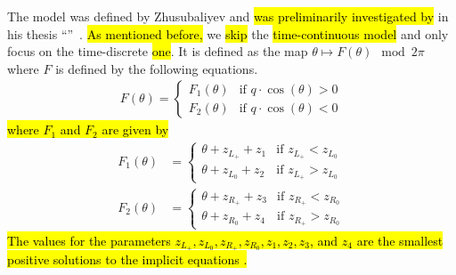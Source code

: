 The model was defined by Zhusubaliyev and \hl{was preliminarily investigated by } in his thesis ``''~\cite{akyuz2022}.
\hl{As mentioned before,} we \hl{skip} the \hl{time-continuous model} and only focus on the time-discrete \hl{one}.
It is defined as the map $\theta \mapsto F(\theta) \mod 2 \pi$ where $F$ is defined by the following equations.
\begin{align}
	F(\theta) = \begin{cases}
		            F_1(\theta) & \text{if } q \cdot \cos(\theta) > 0 \\
		            F_2(\theta) & \text{if } q \cdot \cos(\theta) < 0
	            \end{cases}
\end{align}
\hl{where $F_1$ and $F_2$ are given by}
\begin{subequations}
	\begin{align}
		F_1(\theta) & = \begin{cases}
			                \theta + z_{L_+} + z_1 & \text{if } z_{L_+} < z_{L_0} \\
			                \theta + z_{L_0} + z_2 & \text{if } z_{L_+} > z_{L_0}
		                \end{cases} \\
		F_2(\theta) & = \begin{cases}
			                \theta + z_{R_+} + z_3 & \text{if } z_{R_+} < z_{R_0} \\
			                \theta + z_{R_0} + z_4 & \text{if } z_{R_+} > z_{R_0}
		                \end{cases}
	\end{align}
\end{subequations}
\hl{
	The values for the parameters $z_{L_+}, z_{L_0}, z_{R_+}, z_{R_0}, z_1, z_2, z_3$, and $z_4$ are the smallest positive solutions to the implicit equations .
}

